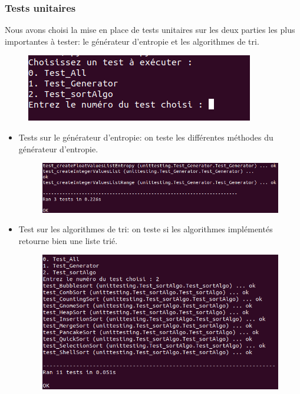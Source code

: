 \documentclass[10pt,a4paper]{article}
\begin{document}
      \newpage

        
        
        \subsubsection{Tests unitaires}
        
            Nous avons choisi la mise en place de tests unitaires sur les deux parties les plus importantes à tester: le générateur d'entropie et les algorithmes de tri.

            
            \begin{figure}[h]
                \centering
                \includegraphics[scale=0.5]{img/test_runner.png}
            \end{figure}

            \begin{itemize}
                \item Tests sur le générateur d'entropie: on teste les différentes méthodes du générateur d'entropie.
                     \begin{figure}[h]
                    \centering
                    \includegraphics[scale=0.5]{img/test_generateur.png}
                \end{figure}
                
                \item Test sur les algorithmes de tri:
                on teste si les algorithmes implémentés retourne bien une liste trié.
                     \begin{figure}[h]
                    \centering
                    \includegraphics[scale=0.5]{img/test_algo.png}
                \end{figure}
            \end{itemize}
    
\end{document}
